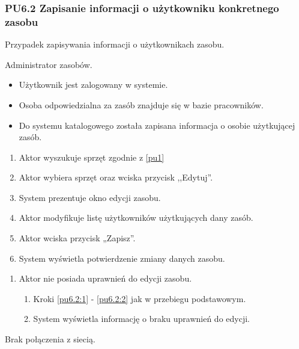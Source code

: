 \subsubsection{PU6.2 Zapisanie informacji o użytkowniku konkretnego zasobu}
Przypadek zapisywania informacji o użytkownikach zasobu.

Administrator zasobów.

\begin{itemize}
\item Użytkownik jest zalogowany w systemie.
\item Osoba odpowiedzialna za zasób znajduje się w bazie pracowników.
\end{itemize}

\begin{itemize}
\item Do systemu katalogowego została zapisana informacja o osobie użytkującej zasób.
\end{itemize}

\begin{enumerate}
	\item \label{pu6.2:1} Aktor wyszukuje sprzęt zgodnie z \ref{pu1}
	\item \label{pu6.2:2} Aktor wybiera sprzęt oraz wciska przycisk ,,Edytuj''.
	\item System prezentuje okno edycji zasobu.
	\item Aktor modyfikuje listę użytkowników użytkujących dany zasób.
	\item Aktor wciska przycisk „Zapisz”.
	\item System wyświetla potwierdzenie zmiany danych zasobu.
\end{enumerate}

\begin{enumerate}
	\item Aktor nie posiada uprawnień do edycji zasobu.
	\begin{enumerate}[label*=\arabic*.]
		\item Kroki \ref{pu6.2:1} - \ref{pu6.2:2} jak w przebiegu podstawowym.
		\item System wyświetla informację o braku uprawnień do edycji.
	\end{enumerate}
\end{enumerate}

Brak połączenia z siecią.

